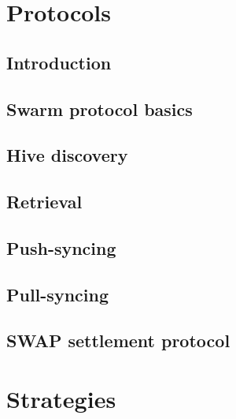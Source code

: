 \chapter{Protocols}\label{spec:protocol}

\section{Introduction \statusorange}\label{spec:protocol:intro}


\section{Swarm protocol basics\statusgreen}\label{spec:protocol:basics}


\section{Hive discovery  \statusgreen}\label{spec:protocol:hive}


\section{Retrieval  \statusorange  \statuspriority}\label{spec:protocol:retrieval}


\section{Push-syncing  \statusorange  \statuspriority}\label{spec:protocol:push-sync}


\section{Pull-syncing \statusorange  \statuspriority}\label{spec:protocol:pull-sync}


\section{SWAP settlement protocol \statusorange}\label{spec:protocol:swap}


\chapter{Strategies \statusorange}\label{spec:strategy}


